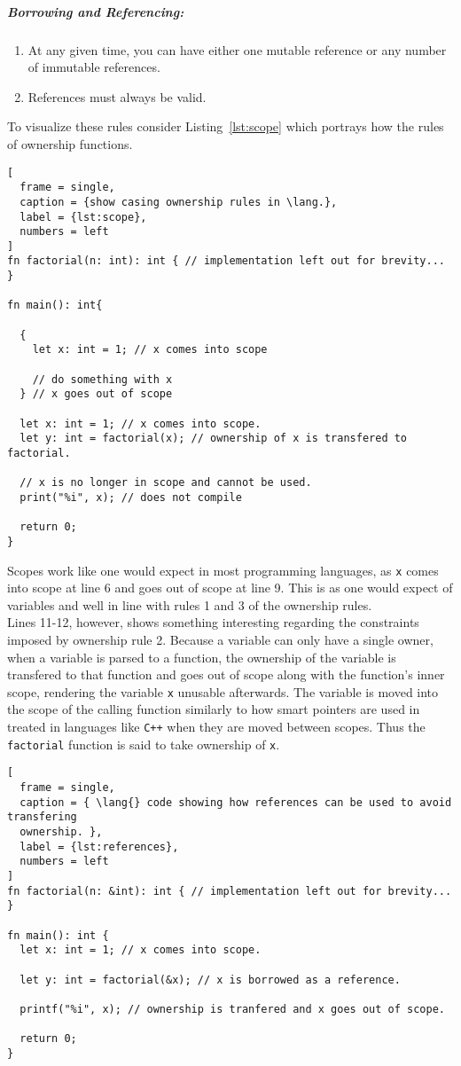 \subparagraph{Borrowing and Referencing:}
\label{par:borrowing}

\begin{enumerate}
  \item At any given time, you can have either one mutable reference or any number of
    immutable references\cite{RUST}.
  \item References must always be valid\cite{RUST}.
\end{enumerate}

To visualize these rules consider Listing~\ref{lst:scope} which portrays how the
rules of ownership functions.

\begin{lstlisting}[
  frame = single,
  caption = {show casing ownership rules in \lang.},
  label = {lst:scope},
  numbers = left
]
fn factorial(n: int): int { // implementation left out for brevity... }

fn main(): int{
  
  {
    let x: int = 1; // x comes into scope

    // do something with x
  } // x goes out of scope

  let x: int = 1; // x comes into scope.
  let y: int = factorial(x); // ownership of x is transfered to factorial.

  // x is no longer in scope and cannot be used.
  print("%i", x); // does not compile

  return 0;
}
\end{lstlisting}

Scopes work like one would expect in most programming languages, as \texttt{x} comes into
scope at line 6 and goes out of scope at line 9. This is as one would expect of
variables and well in line with rules 1 and 3 of the ownership
rules. \\

Lines 11-12, however, shows something interesting regarding the constraints imposed
by ownership rule 2. Because a variable can only have a single owner, when a variable
is parsed to a function, the ownership of the variable is transfered to that function
and goes out of scope along with the function's inner scope, rendering the variable
\texttt{x} unusable afterwards. The variable is moved into the scope of the calling
function similarly to how smart pointers are used in treated in languages like
\texttt{C++} when they are moved between scopes\cite{CPPRef}. Thus the
\texttt{factorial} function is said to take ownership of \texttt{x}.

\begin{lstlisting}[
  frame = single,
  caption = { \lang{} code showing how references can be used to avoid transfering
  ownership. }, 
  label = {lst:references},
  numbers = left
]
fn factorial(n: &int): int { // implementation left out for brevity... }

fn main(): int {
  let x: int = 1; // x comes into scope.

  let y: int = factorial(&x); // x is borrowed as a reference.

  printf("%i", x); // ownership is tranfered and x goes out of scope.

  return 0;
}
\end{lstlisting}

